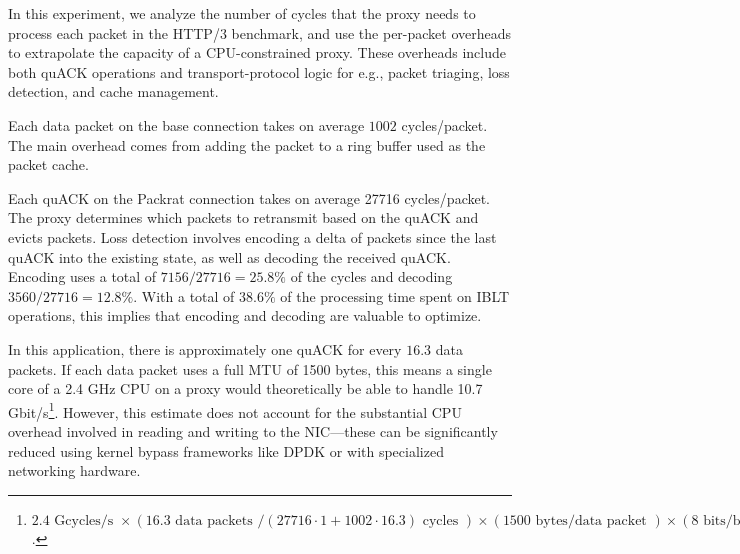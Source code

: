 In this experiment, we analyze the number of cycles that the proxy
needs to process each
packet in the HTTP/3 benchmark, and use the per-packet overheads to
extrapolate the capacity of a CPU-constrained proxy. These overheads
include both quACK operations and transport-protocol logic for e.g.,
packet triaging, loss detection, and cache management.

Each data packet on the base connection takes on average $1002$ cycles/packet.
The main overhead comes from adding the packet to a ring buffer used as the
packet cache.

Each quACK on the Packrat connection takes on average 27716 cycles/packet. The
proxy determines which packets to retransmit based on the quACK and evicts
packets. Loss detection involves encoding a delta of packets since the last
quACK into the existing state, as well as decoding the received quACK. Encoding
uses a total of $7156/27716 = 25.8\%$ of the cycles and decoding $3560/27716 =
12.8\%$. With a total of $38.6\%$ of the processing time spent on IBLT
operations, this implies that encoding and decoding are valuable to optimize.



In this application, there is approximately one quACK for every $16.3$ data
packets. If each data packet uses a full MTU of 1500 bytes, this means a single
core of a 2.4 GHz CPU on a proxy would theoretically be able to handle 10.7
Gbit/s\footnote{ $2.4\text{ Gcycles/s }
\times(16.3 \text{ data packets } / (27716\cdot1 + 1002\cdot16.3) \text{ cycles })
\times (1500 \text{ bytes/data packet })
\times (8 \text{ bits/byte })
= 10.7 \text{ Gbit/s}$.
}. However, this estimate does not account for the substantial CPU overhead
involved in reading and writing to the NIC---these can be significantly reduced
using kernel bypass frameworks like DPDK or with specialized networking
hardware.


